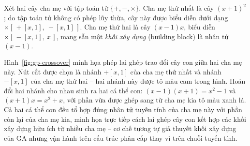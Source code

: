 Xét hai cây cha mẹ với tập toán tử $\{+,-,\times\}$. Cha mẹ thứ nhất
là cây $(x+1)^2$; do tập toán tử không có phép lũy thừa, cây này được
biểu diễn dưới dạng $\times[\,+[x,1],\ +[x,1]\,]$. Cha mẹ thứ hai là
cây $(x-1)x$, biểu diễn $\times[\,-[x,1],\ x\,]$, mang sẵn một
\textit{khối xây dựng} (building block) là nhân tử $(x-1)$.

Hình~\ref{fig:gp-crossover} minh họa phép lai ghép trao đổi cây con
giữa hai cha mẹ này. Nút cắt được chọn là nhánh $+[x,1]$ của cha mẹ
thứ nhất và nhánh $-[x,1]$ của cha mẹ thứ hai -- hai nhánh này được tô
màu cam trong hình. Hoán đổi hai nhánh cho nhau sinh ra hai cá thể
con: $(x-1)(x+1) = x^2 - 1$ và $(x+1)x = x^2 + x$, với phần vừa được
ghép sang từ cha mẹ kia tô màu xanh lá. Cả hai cá thể con đều tổ hợp
đúng nhân tử tuyến tính của cha mẹ này với phần còn lại của cha mẹ
kia, minh họa trực tiếp cách lai ghép cây con kết hợp các khối xây
dựng hữu ích từ nhiều cha mẹ -- cơ chế tương tự giả thuyết khối xây
dựng của GA nhưng vận hành trên cấu trúc phân cấp thay vì trên chuỗi
tuyến tính.

